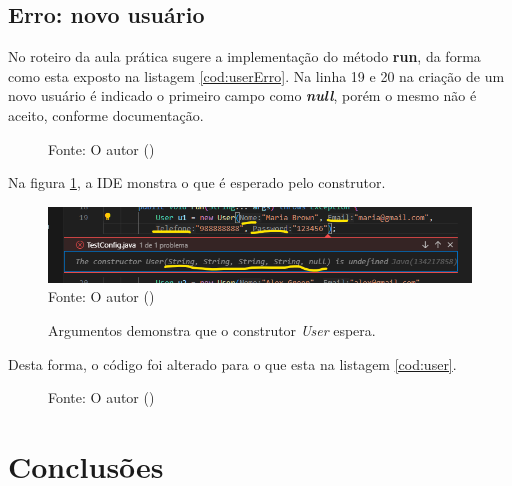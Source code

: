\subsection{Erro: novo usuário}

\par No roteiro da aula prática sugere a implementação do método \textbf{run}, da forma como esta exposto na listagem \ref{cod:userErro}. Na linha 19 e 20 na criação de um novo usuário é indicado o primeiro campo como \textit{\textbf{null}}, porém o mesmo não é aceito, conforme documentação.

\begin{figure}[H]
  \flushleft %
    {\fontsize{10pt}{\baselineskip}\selectfont  Fonte: O autor (\the\year) }
\end{figure}

\par Na figura \ref{fig:sugconstrutor}, a IDE monstra o que é esperado pelo construtor.

\begin{figure}[H]
  \caption{Argumentos demonstra que o construtor \textit{User} espera.}
  \includegraphics[scale=0.8]{figure/user_jaova.png}
  \label{fig:sugconstrutor}
  \flushleft %
  {\fontsize{10pt}{\baselineskip}\selectfont  Fonte: O autor (\the\year) }
\end{figure}
\par Desta forma, o código foi alterado para o que esta na listagem \ref{cod:user}.


\begin{figure}[H]
  \flushleft %
  {\fontsize{10pt}{\baselineskip}\selectfont  Fonte: O autor (\the\year) }
\end{figure}



\section{Conclusões}





